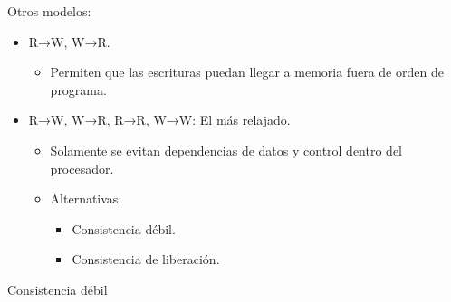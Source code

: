 \documentclass[12pt, twoside, openright]{report} %
\begin{document}
    Otros modelos:

    \begin{itemize}
    
    \item
      R→W, W→R.

      \begin{itemize}
      
      \item
        Permiten que las escrituras puedan llegar a memoria fuera de
        orden de programa.
      \end{itemize}
    \item
      R→W, W→R, R→R, W→W: El más relajado.

      \begin{itemize}
      
      \item
        Solamente se evitan dependencias de datos y control dentro del
        procesador.
      \item
        Alternativas:

        \begin{itemize}
        
        \item
          Consistencia débil.
        \item
          Consistencia de liberación.
        \end{itemize}
      \end{itemize}
    \end{itemize}

    Consistencia débil
\end{document}
